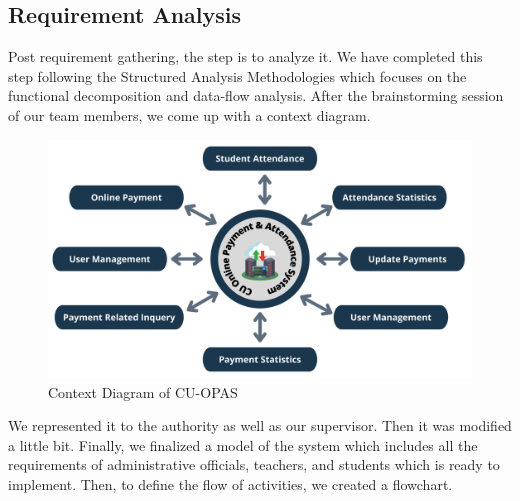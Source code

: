 \subsection{Requirement Analysis}\label{sub: reqana}
Post requirement gathering, the step is to analyze it. We have completed this step following the Structured Analysis Methodologies which focuses on the functional decomposition and data-flow analysis. After the brainstorming session of our team members, we come up with a context diagram.\\
\begin{figure}[H]
    \centering
    \includegraphics[width=1\textwidth]{images/context}
    \caption{Context Diagram of CU-OPAS}
    \label{fig:context}
\end{figure}
We represented it to the authority as well as our supervisor. Then it was modified a little bit. Finally, we finalized a model of the system which includes all the requirements of administrative officials, teachers, and students which is ready to implement. Then, to define the flow of activities, we created a flowchart.\\
